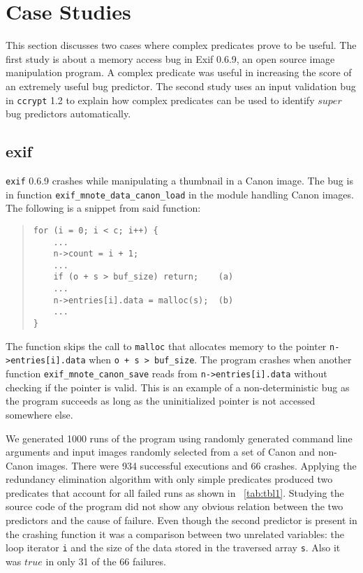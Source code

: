 \section{Case Studies}
\label{sec-qual}
This section discusses two cases where complex predicates prove to be useful.  The first study is about a memory access bug in Exif 0.6.9, an open source image manipulation program.  A complex predicate was useful in increasing the score of an extremely useful bug predictor.  The second study uses an input validation bug in \texttt{ccrypt} 1.2 to explain how complex predicates can be used to identify $super$ bug predictors automatically.

\subsection{exif}
\texttt{exif} 0.6.9 crashes while manipulating a thumbnail in a Canon image.  The bug is in function \texttt{exif\_mnote\_data\_canon\_load} in the module handling Canon images.  The following is a snippet from said function:
\begin{quote}
\begin{verbatim}
for (i = 0; i < c; i++) {
    ...
    n->count = i + 1;
    ...
    if (o + s > buf_size) return;    (a)
    ...
    n->entries[i].data = malloc(s);  (b)
    ...
}
\end{verbatim}
\end{quote}

The function skips the call to \texttt{malloc} that allocates memory to the pointer \texttt{n->entries[i].data} when \texttt{o + s > buf\_size}.  The program crashes when another function \texttt{exif\_\-mnote\_\-canon\_save} reads from \texttt{n->entries[i].data} without checking if the pointer is valid.  This is an example of a non-deterministic bug as the program succeeds as long as the uninitialized pointer is not accessed somewhere else.

We generated 1000 runs of the program using randomly generated command line arguments and input images randomly selected from a set of Canon and non-Canon images.  There were 934 successful executions and 66 crashes.  Applying the redundancy elimination algorithm with only simple predicates produced two predicates that account for all failed runs as shown in ~\autoref{tab:tbl1}.  Studying the source code of the program did not show any obvious relation between the two predictors and the cause of failure.  Even though the second predictor is present in the crashing function it was a comparison between two unrelated variables: the loop iterator \texttt{i} and the size of the data stored in the traversed array \texttt{s}.  Also it was $true$ in only 31 of the 66 failures.

